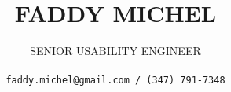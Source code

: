 \title{
\uppercase{Faddy Michel}
}

\author{
\uppercase{Senior Usability Engineer}\\ \\
\texttt{faddy.michel@gmail.com / (347) 791-7348}
}

\date{}

\maketitle
